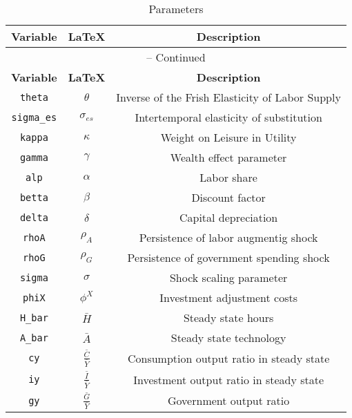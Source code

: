 \begin{center}
\begin{longtable}{ccc}
\caption{Parameters}\\%
\hline%
\multicolumn{1}{c}{\textbf{Variable}} &
\multicolumn{1}{c}{\textbf{\LaTeX}} &
\multicolumn{1}{c}{\textbf{Description}}\\%
\hline\hline%
\endfirsthead
\multicolumn{3}{c}{{\tablename} \thetable{} -- Continued}\\%
\hline%
\multicolumn{1}{c}{\textbf{Variable}} &
\multicolumn{1}{c}{\textbf{\LaTeX}} &
\multicolumn{1}{c}{\textbf{Description}}\\%
\hline\hline%
\endhead
\texttt{theta} & ${\theta}$ & Inverse of the Frish Elasticity of Labor Supply\\
\texttt{sigma\_es} & ${\sigma_{es}}$ & Intertemporal elasticity of substitution\\
\texttt{kappa} & ${\kappa}$ & Weight on Leisure in Utility\\
\texttt{gamma} & ${\gamma}$ & Wealth effect parameter\\
\texttt{alp} & ${\alpha}$ & Labor share\\
\texttt{betta} & ${\beta}$ & Discount factor\\
\texttt{delta} & ${\delta}$ & Capital depreciation\\
\texttt{rhoA} & ${\rho_{A}}$ & Persistence of labor augmentig shock\\
\texttt{rhoG} & ${\rho_{G}}$ & Persistence of government spending shock\\
\texttt{sigma} & ${\sigma}$ & Shock scaling parameter\\
\texttt{phiX} & ${\phi^X}$ & Investment adjustment costs\\
\texttt{H\_bar} & $\bar{H}$ & Steady state hours\\
\texttt{A\_bar} & $\bar{A}$ & Steady state technology\\
\texttt{cy} & $\frac{\bar{C}}{\bar{Y}}$ & Consumption output ratio in steady state\\
\texttt{iy} & $\frac{\bar{I}}{\bar{Y}}$ & Investment output ratio in steady state\\
\texttt{gy} & $\frac{\bar{G}}{\bar{Y}}$ & Government output ratio\\
\hline%
\end{longtable}
\end{center}
